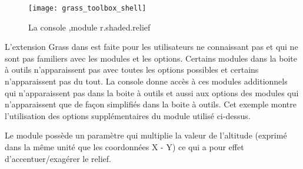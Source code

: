 \begin{figure}[ht]
 \begin{center}

 \texttt{[image: grass\_toolbox\_shell]}
 \caption{La console \grass,module r.shaded.relief \nixcaption}\label{fig:grass_toolbox_shell}
 \end{center}
\end{figure}
L'extension Grass dans \qg est faite pour les utilisateurs ne connaissant pas \grass et qui ne sont pas familiers avec les modules et les options.
Certains modules dans la boite à outils n'apparaissent pas avec toutes les options possibles et certains n'apparaissent pas du tout. La console \grass donne accès à ces modules additionnels qui n'apparaissent pas dans la boite à outils et aussi aux options des modules qui n'apparaissent que de façon simplifiés dans la boite à outils. Cet exemple montre l'utilisation des options supplémentaires du module  utilisé ci-dessus.



Le module  possède un paramètre  qui multiplie la valeur de l'altitude (exprimé dans la même unité que les coordonnées X - Y) ce qui a pour effet d'accentuer/exagérer le relief.

